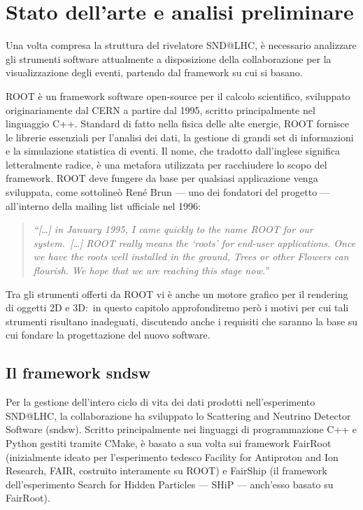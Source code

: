 \chapter{Stato dell'arte e analisi preliminare}

Una volta compresa la struttura del rivelatore SND@LHC, è necessario analizzare gli strumenti software attualmente a disposizione della collaborazione per la visualizzazione degli eventi, partendo dal framework su cui si basano.

ROOT è un framework software open-source per il calcolo scientifico, sviluppato
originariamente dal CERN a partire dal 1995, scritto principalmente nel linguaggio C++.
Standard di fatto nella fisica delle alte energie, ROOT fornisce le librerie essenziali per l'analisi dei dati, la gestione di grandi set di informazioni e la simulazione statistica di eventi.
Il nome, che tradotto dall'inglese significa letteralmente radice, è una metafora utilizzata per racchiudere lo scopo del framework.
ROOT deve fungere da base per qualsiasi applicazione venga sviluppata, come sottolineò René Brun --- uno dei fondatori del progetto --- all'interno della mailing list ufficiale nel 1996:
\begin{quote}
    \textit{“[\ldots] in January 1995, I came quickly to the name ROOT for our system.\ [\ldots] ROOT really means the `roots' for end-user applications. Once we have the roots well installed in the ground, Trees or other Flowers can flourish. We hope that we are reaching this stage now.”}\cite{root_name_origin}
\end{quote}

Tra gli strumenti offerti da ROOT vi è anche un motore grafico per il rendering di oggetti 2D e 3D:\ in questo capitolo approfondiremo però i motivi per cui tali strumenti risultano inadeguati, discutendo anche i requisiti che saranno la base su cui fondare la progettazione del nuovo software.

%
%
\section{Il framework sndsw}
Per la gestione dell'intero ciclo di vita dei dati prodotti nell'esperimento SND@LHC, la collaborazione ha sviluppato lo Scattering and Neutrino Detector Software (sndsw).
Scritto principalmente nei linguaggi di programmazione C++ e Python gestiti tramite CMake, è basato a sua volta sui framework FairRoot (inizialmente ideato per l’esperimento tedesco Facility for Antiproton and Ion Research, FAIR, costruito interamente su ROOT) e FairShip (il framework dell’esperimento Search for Hidden Particles --- SHiP --- anch'esso basato su FairRoot).

